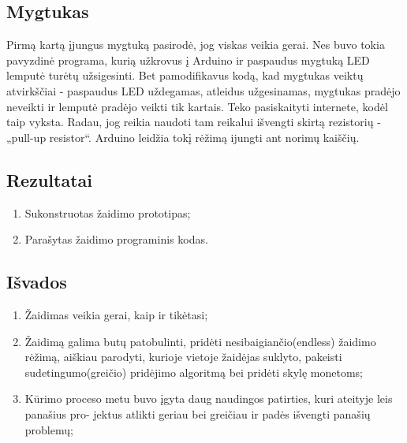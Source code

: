 \documentclass{VUMIFPSkursinis}
\begin{document}
  \subsection{Mygtukas}
    Pirmą kartą įjungus mygtuką pasirodė, jog viskas veikia gerai. Nes buvo tokia pavyzdinė programa,
    kurią užkrovus į Arduino ir paspaudus mygtuką LED lemputė turėtų užsigesinti.
    Bet pamodifikavus kodą, kad mygtukas veiktų atvirkščiai - paspaudus LED uždegamas, atleidus užgesinamas,
    mygtukas pradėjo neveikti ir lemputė pradėjo veikti tik kartais.
    Teko pasiskaityti internete, kodėl taip vyksta. Radau, jog reikia naudoti tam reikalui išvengti skirtą
    rezistorių - „pull-up resistor“. Arduino leidžia tokį rėžimą ijungti ant norimų kaiščių.



  \subsection{Rezultatai}
    \begin{enumerate}
      \item Sukonstruotas žaidimo prototipas;
      \item Parašytas žaidimo programinis kodas.
    \end{enumerate}

  \subsection{Išvados}
    \begin{enumerate}
      \item Žaidimas veikia gerai, kaip ir tikėtasi;
      \item Žaidimą galima butų patobulinti, pridėti nesibaigiančio(endless) žaidimo rėžimą,
            aiškiau parodyti, kurioje vietoje žaidėjas suklyto, pakeisti sudetingumo(greičio) pridėjimo
            algoritmą bei pridėti skylę monetoms;
      \item Kūrimo proceso metu buvo įgyta daug naudingos patirties, kuri ateityje leis panašius pro-
            jektus atlikti geriau bei greičiau ir padės išvengti panašių problemų;
    \end{enumerate}


\appendix  %
\end{document}
